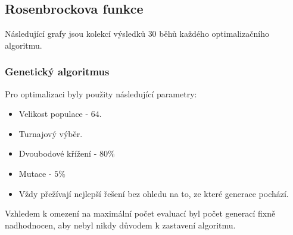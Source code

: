 \subsection{Rosenbrockova funkce}
\label{app:bench:rosen}

Následující grafy jsou kolekcí výsledků $30$ běhů každého optimalizačního algoritmu.
\subsubsection{Genetický algoritmus}
Pro optimalizaci byly použity následující parametry:
\begin{itemize}
    \item Velikost populace - $64$.
    \item Turnajový výběr.
    \item Dvoubodové křížení - $80\%$
    \item Mutace - $5\%$
    \item Vždy přežívají nejlepší řešení bez ohledu na to, ze které generace pochází.
\end{itemize}
Vzhledem k omezení na maximální počet evaluací byl počet generací fixně nadhodnocen, aby nebyl nikdy důvodem k zastavení algoritmu. 


